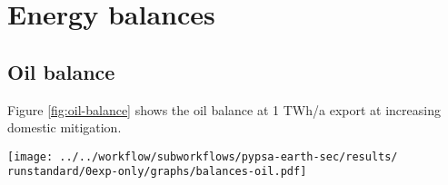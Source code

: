 \section{Energy balances}



\subsection{Oil balance}
\label{subsec:oil-balance}
Figure \ref{fig:oil-balance} shows the oil balance at 1 TWh/a export at increasing domestic mitigation.

\begin{figure*}[h]
    \centering
    \texttt{[image: ../../workflow/subworkflows/pypsa-earth-sec/results/\\runstandard/0exp-only/graphs/balances-oil.pdf]}
    \caption{Oil balance at 1 TWh/a export at increasing domestic mitigation. The exogenously defined oil demand for land transport substantially decreases due to electrification, oil demands for industrial naphta, aviation, agriculture are constant. The demand is met by fossil oil up to 80\% mitigation, then gradually replaced by Fischer-Tropsch fuels.}
    \label{fig:oil-balance}
\end{figure*}





    
    

    
    

\clearpage